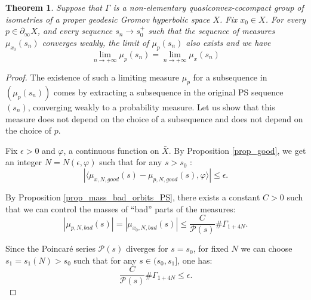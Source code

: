 \documentclass[12pt]{amsbook}%
\newtheorem{thm}{Theorem}[chapter]
\theoremstyle{definition}
\theoremstyle{remark}
\numberwithin{section}{chapter}
\numberwithin{subsection}{section}
\numberwithin{figure}{chapter}
\def\cP{{\mathscr{P}}}
\def\Ga{\Gamma}
\def\La{\Lambda}
\def\geo{\partial_\infty}
\begin{document}
{{\begin{thm}\label{thm:rank1-equi} 
Suppose that $\Gamma$ is a non-elementary quasiconvex-cocom\-pact group of isometries of a proper geodesic 
Gromov hyperbolic space $X$. 
Fix $x_0 \in X$.  For every $p \in \geo  X$, and every sequence $s_n\rightarrow s_0^+$ such that the sequence of measures   
$ \mu_{x_0}(s_n)$ converges weakly, the limit of $\mu_p(s_n)$ also exists and  we have  
\begin{equation*}
\lim_{n\rightarrow +\infty} \mu_p(s_n) = \lim_{n\rightarrow +\infty} \mu_x(s_n)
\end{equation*}
\end{thm}
  
\begin{proof}
The existence of such a limiting measure $\mu_p$ for a subsequence in $(\mu_p(s_n))$ 
comes by extracting a subsequence in the original PS sequence $(s_n)$, 
converging weakly to a probability measure.   
Let us show that this measure does not depend on the choice of a subsequence and does not depend on the choice of $p$. 

Fix $\epsilon >0$ and $\varphi$, a continuous function on $\bar X$. 
By Proposition \ref{prop_good}, we get an integer  $N = N(\epsilon,\varphi)$  such that for any $s > s_0$ :
\begin{equation} \label{eq_good}
| \langle \mu_{x, N , good}(s) - \mu_{p, N , good}(s) , \varphi \rangle | \leqslant \epsilon.
\end{equation}




By Proposition \ref{prop_mass_bad_orbits_PS}, there exists a constant $C> 0$ such that we can control the masses of ``bad'' parts of 
the measures:  
\begin{equation*} 
|\mu_{p, N , bad}(s)| = |\mu_{x_0, N , bad}(s)| \leqslant \dfrac{C}{\cP(s)} \# \Gamma_{1+4N} .
\end{equation*}





Since the Poincar\'e series $\cP(s)$ diverges for $s=s_0$, for fixed $N$ we can choose $s_1=s_1(N) > s_0$ 
such that for any $s \in (s_0,s_1] $, one has: 
\begin{equation*}
\dfrac{C}{\cP(s)} \# \Gamma_{1+4N} \leqslant \epsilon.
\end{equation*} 





\end{proof}}}
\end{document}
